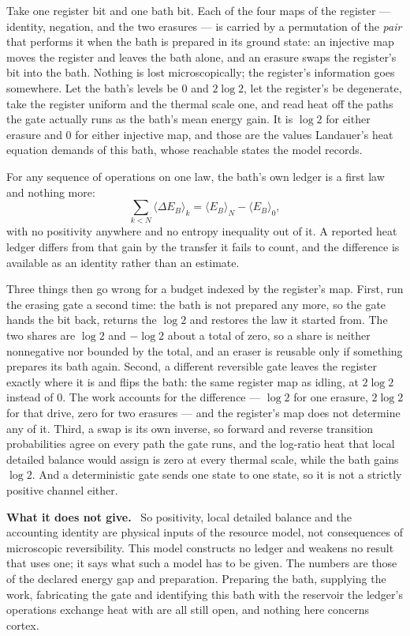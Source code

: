 \documentclass[11pt]{article}
\newcommand{\scope}{\par\smallskip\noindent\textbf{What it does not give.}\ }
\begin{document}
Take one register bit and one bath bit. Each of the four maps of the register
--- identity, negation, and the two erasures --- is carried by a permutation
of the \emph{pair} that performs it when the bath is prepared in its ground
state: an injective map moves the register and leaves the bath alone, and an
erasure swaps the register's bit into the bath. Nothing is lost
microscopically; the register's information goes somewhere. Let the bath's
levels be $0$ and $2\log2$, let the register's be degenerate, take the
register uniform and the thermal scale one, and read heat off the paths the
gate actually runs as the bath's mean energy gain. It is $\log2$ for either
erasure and $0$ for either injective map, and those are the values Landauer's
heat equation demands of this bath, whose reachable states the model records.

For any sequence of operations on one law, the bath's own ledger is a first
law and nothing more:
\[
 \sum_{k<N}\langle\Delta E_B\rangle_k=\langle E_B\rangle_N-\langle E_B\rangle_0 ,
\]
with no positivity anywhere and no entropy inequality out of it. A reported
heat ledger differs from that gain by the transfer it fails to count, and the
difference is available as an identity rather than an estimate.

Three things then go wrong for a budget indexed by the register's map. First,
run the erasing gate a second time: the bath is not prepared any more, so the
gate hands the bit back, returns the $\log2$ and restores the law it started
from. The two shares are $\log2$ and $-\log2$ about a total of zero, so a
share is neither nonnegative nor bounded by the total, and an eraser is
reusable only if something prepares its bath again. Second, a different
reversible gate leaves the register exactly where it is and flips the bath:
the same register map as idling, at $2\log2$ instead of $0$. The work
accounts for the difference --- $\log2$ for one erasure, $2\log2$ for that
drive, zero for two erasures --- and the register's map does not determine
any of it. Third, a swap is its own inverse, so forward and reverse
transition probabilities agree on every path the gate runs, and the
log-ratio heat that local detailed balance would assign is zero at every
thermal scale, while the bath gains $\log2$. And a deterministic gate sends one
state to one state, so it is not a strictly positive channel either.

\scope
So positivity, local detailed balance and the accounting identity are physical
inputs of the resource model, not consequences of microscopic reversibility.
This model constructs no ledger and weakens no result that uses one; it says
what such a model has to be given. The numbers are those of the declared
energy gap and preparation. Preparing the bath, supplying the work,
fabricating the gate and identifying this bath with the reservoir the ledger's
operations exchange heat with are all still open, and nothing here concerns
cortex.
\end{document}
